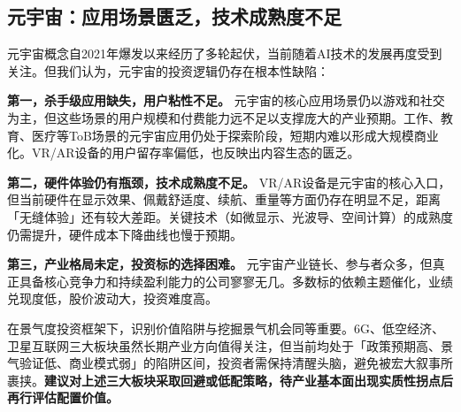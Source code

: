 \begin{exhibitbox}
\vspace{0.4em}
\end{exhibitbox}

\subsection{元宇宙：应用场景匮乏，技术成熟度不足}

元宇宙概念自2021年爆发以来经历了多轮起伏，当前随着AI技术的发展再度受到关注。但我们认为，元宇宙的投资逻辑仍存在根本性缺陷：

\textbf{第一，杀手级应用缺失，用户粘性不足。} 元宇宙的核心应用场景仍以游戏和社交为主，但这些场景的用户规模和付费能力远不足以支撑庞大的产业预期。工作、教育、医疗等ToB场景的元宇宙应用仍处于探索阶段，短期内难以形成大规模商业化。VR/AR设备的用户留存率偏低，也反映出内容生态的匮乏。

\textbf{第二，硬件体验仍有瓶颈，技术成熟度不足。} VR/AR设备是元宇宙的核心入口，但当前硬件在显示效果、佩戴舒适度、续航、重量等方面仍存在明显不足，距离「无缝体验」还有较大差距。关键技术（如微显示、光波导、空间计算）的成熟度仍需提升，硬件成本下降曲线也慢于预期。

\textbf{第三，产业格局未定，投资标的选择困难。} 元宇宙产业链长、参与者众多，但真正具备核心竞争力和持续盈利能力的公司寥寥无几。多数标的依赖主题催化，业绩兑现度低，股价波动大，投资难度高。

\begin{keyinsight}[本章小结]
在景气度投资框架下，识别价值陷阱与挖掘景气机会同等重要。6G、低空经济、卫星互联网三大板块虽然长期产业方向值得关注，但当前均处于「政策预期高、景气验证低、商业模式弱」的陷阱区间，投资者需保持清醒头脑，避免被宏大叙事所裹挟。\textbf{建议对上述三大板块采取回避或低配策略，待产业基本面出现实质性拐点后再行评估配置价值。}
\end{keyinsight}
